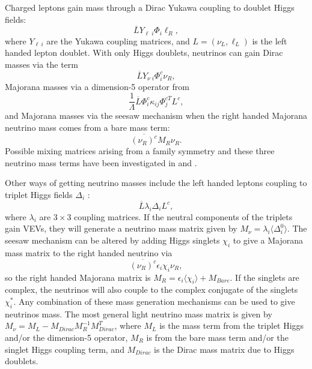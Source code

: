 \documentclass[nofootinbib,showpacs]{revtex4}
\begin{document}
Charged leptons gain mass through a Dirac Yukawa coupling to doublet Higgs fields: 
\begin{equation}
\overline{L}Y_{\ell\; i} \Phi_i \ell_R,
\end{equation}
where $Y_{\ell\: i}$ are the Yukawa coupling matrices, and $L=(\nu_L, \ell_L)$ is the left handed lepton doublet.
With only Higgs doublets, neutrinos can gain Dirac masses via the term
\begin{equation}
\overline{L} Y_{\nu\; i} \Phi^c_i \nu_R,
\end{equation}
Majorana masses via a dimension-5 operator \cite{dim5} from
\begin{equation}
\frac{1}{\Lambda}\overline{L} \Phi^c_i \kappa_{ij} \Phi^{c T}_j L^c,
\end{equation}
and Majorana masses via the seesaw mechanism \cite{seesaw1,seesaw2,seesaw3,seesaw4,seesaw5} when the right handed Majorana neutrino mass comes from a bare mass term:
\begin{equation}
\overline{(\nu_R)^c} M_R \nu_R.
\end{equation}
 Possible mixing matrices arising from a family symmetry and these three neutrino mass terms have been investigated in \cite{nogo1} and \cite{nogo2}. 

Other ways of getting neutrino masses include the left handed leptons coupling to triplet Higgs fields $\Delta_i$ \cite{triplet}:
\begin{equation}
\overline{L}\lambda_i \Delta_i L^c, 
\end{equation}
where $\lambda_i$ are $3\times 3$ coupling matrices.
If the neutral components of the triplets gain VEVs, they will generate a neutrino mass matrix given by $M_\nu=\lambda_i \langle \Delta^0_i \rangle$.
The seesaw mechanism can be altered by adding Higgs singlets $\chi_i$ to give a Majorana mass matrix to the right handed neutrino via 
\begin{equation}
\overline{(\nu_R)^c}\epsilon_i \chi_i \nu_R,
\end{equation}
 so the right handed Majorana matrix is $M_R=\epsilon_i \langle \chi_i \rangle +M_{Bare}$. If the singlets are complex, the neutrinos will also couple to the complex conjugate of the singlets $\chi^*_i$.
Any combination of these mass generation mechanisms can be used to give neutrinos mass. The most general light neutrino mass matrix is given by $M_{\nu} = M_L - M_{Dirac} M_R^{-1} M_{Dirac}^T$, where $M_L$ is the mass term from the triplet Higgs and/or the dimension-5 operator, $ M_R$ is from the bare mass term and/or the singlet Higgs coupling term, and $M_{Dirac}$ is the Dirac mass matrix due to Higgs doublets.
\end{document}
